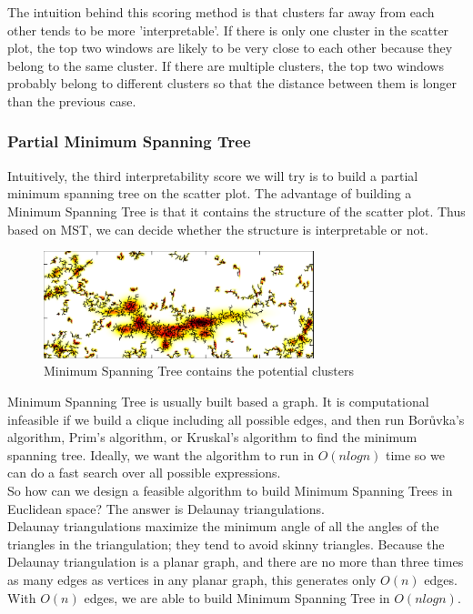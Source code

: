 \documentclass[fleqn]{SelfArx} %
\begin{document}
The intuition behind this scoring method is that clusters far away from each other tends to be more 'interpretable'. If there is only one cluster in the scatter plot, the top two windows are likely to be very close to each other because they belong to the same cluster. If there are multiple clusters, the top two windows probably belong to different clusters so that the distance between them is longer than the previous case.

\subsubsection{Partial Minimum Spanning Tree}

Intuitively, the third interpretability score we will try is to build a partial minimum spanning tree on the scatter plot. The advantage of building a Minimum Spanning Tree is that it contains the structure of the scatter plot. Thus based on MST, we can decide whether the structure is interpretable or not.\\

\begin{figure}[h]
  \centering\includegraphics[width=0.7\textwidth]{fig_great_wall_MST_1}
  \caption{Minimum Spanning Tree contains the potential clusters}
\end{figure}

Minimum Spanning Tree is usually built based a graph. It is computational infeasible if we build a clique including all possible edges, and then run Borůvka's algorithm, Prim's algorithm, or Kruskal's algorithm to find the minimum spanning tree. Ideally, we want the algorithm to run in $O(nlogn)$ time so we can do a fast search over all possible expressions.\\

So how can we design a feasible algorithm to build Minimum Spanning Trees in Euclidean space? The answer is Delaunay triangulations.\\

Delaunay triangulations maximize the minimum angle of all the angles of the triangles in the triangulation; they tend to avoid skinny triangles.\cite{tra} Because the Delaunay triangulation is a planar graph, and there are no more than three times as many edges as vertices in any planar graph, this generates only $O(n)$ edges. With $O(n)$ edges, we are able to build Minimum Spanning Tree in $O(nlogn)$.\cite{mst}\\
\end{document}
